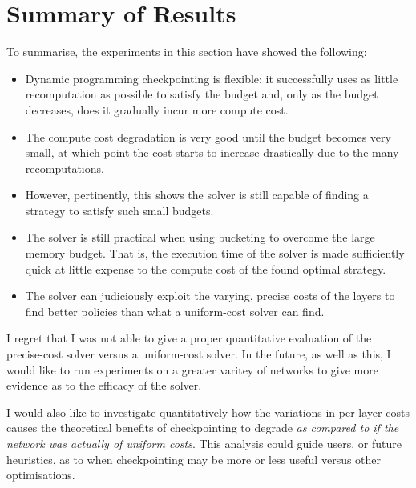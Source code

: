 \section{Summary of Results}
To summarise, the experiments in this section have showed the following:
\begin{itemize}
    \item Dynamic programming checkpointing is flexible: it successfully uses as little recomputation as possible to satisfy the budget and, only as the budget decreases, does it gradually incur more compute cost.
    \item The compute cost degradation is very good until the budget becomes very small, at which point the cost starts to increase drastically due to the many recomputations.
    \item However, pertinently, this shows the solver is still capable of finding a strategy to satisfy such small budgets.
    \item The solver is still practical when using bucketing to overcome the large memory budget. That is, the execution time of the solver is made sufficiently quick at little expense to the compute cost of the found optimal strategy.
    \item The solver can judiciously exploit the varying, precise costs of the layers to find better policies than what a uniform-cost solver can find.
\end{itemize}

I regret that I was not able to give a proper quantitative evaluation of the precise-cost solver versus a uniform-cost solver.
In the future, as well as this, I would like to run experiments on a greater varitey of networks to give more evidence as to the efficacy of the solver.

I would also like to investigate quantitatively how the variations in per-layer costs causes the theoretical benefits of checkpointing to degrade \textit{as compared to if the network was actually of uniform costs}.
This analysis could guide users, or future heuristics, as to when checkpointing may be more or less useful versus other optimisations.
